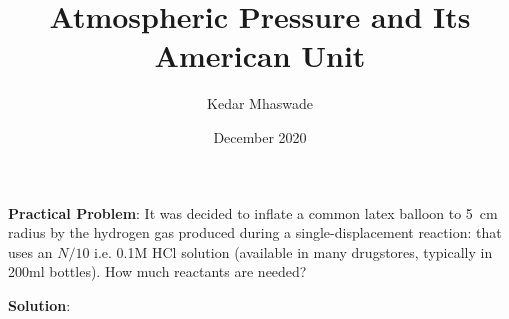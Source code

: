 \documentclass[12pt]{article}
\begin{document}
\title{Atmospheric Pressure and Its American Unit}
\author{Kedar Mhaswade}
\date{December 2020}
\maketitle
\textbf{Practical Problem}: 
It was decided to inflate a common latex balloon to 5~\si{\cm} radius by the hydrogen gas produced during a single-displacement reaction:  that uses an $N/10$ i.e. 0.1M HCl solution (available in many drugstores, typically in 200ml bottles). How much reactants are needed?

\textbf{Solution}:
\end{document}
